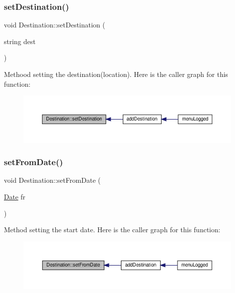 \subsubsection{\texorpdfstring{set\+Destination()}{setDestination()}}
{\footnotesize\ttfamily void Destination\+::set\+Destination (\begin{DoxyParamCaption}\item[{string}]{dest }\end{DoxyParamCaption})}

Methood setting the destination(location). Here is the caller graph for this function\+:\nopagebreak
\begin{figure}[H]
\begin{center}
\leavevmode
\includegraphics[width=350pt]{class_destination_a9cafaaf83be9ea548401caf2a2c4d839_icgraph}
\end{center}
\end{figure}
\mbox{\label{class_destination_a6fc539f51a5fd6844fef290facc4e887}} 
\subsubsection{\texorpdfstring{set\+From\+Date()}{setFromDate()}}
{\footnotesize\ttfamily void Destination\+::set\+From\+Date (\begin{DoxyParamCaption}\item[{\hyperlink{class_date}{Date}}]{fr }\end{DoxyParamCaption})}

Method setting the start date. Here is the caller graph for this function\+:\nopagebreak
\begin{figure}[H]
\begin{center}
\leavevmode
\includegraphics[width=350pt]{class_destination_a6fc539f51a5fd6844fef290facc4e887_icgraph}
\end{center}
\end{figure}
\mbox{\label{class_destination_ac7f1c3be54b5223aa1e9ad4523ef6976}} 
